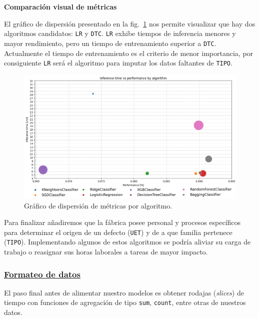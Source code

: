\documentclass[a4paper,12pt]{article}
\begin{document}
		\textbf{Comparación visual de métricas}
				
		El gráfico de dispersión presentado en la fig.~\ref{fig:inference_training_perfo_uet} nos permite visualizar que hay dos algoritmos candidatos: \texttt{LR} y \texttt{DTC}. \texttt{LR} exhibe tiempos de inferencia menores y mayor rendimiento, pero un tiempo de entrenamiento superior a \texttt{DTC}. Actualmente el tiempo de entrenamiento es el criterio de menor importancia, por consiguiente \texttt{LR} será el algoritmo para imputar los datos faltantes de \texttt{TIPO}.
				
		\begin{figure}[H]
			\begin{center}
				\includegraphics[width=1\textwidth]{inference_training_perfo_uet.png}
				\caption{Gráfico de dispersión de métricas por algoritmo.}
				\label{fig:inference_training_perfo_uet}
			\end{center}
		\end{figure}
				
		Para finalizar añadiremos que la fábrica posee personal y procesos específicos para determinar el origen de un defecto (\texttt{UET}) y de a que familia pertenece (\texttt{TIPO}). Implementando algunos de estos algoritmos se podría aliviar su carga de trabajo o  reasignar sus horas laborales a tareas de mayor impacto.
				
		\subsubsection{\href{https://github.com/GeraCollante/tesis-icomp-machinelearning/blob/main/DataFormatting.ipynb}{\color{blue}Formateo de datos}}\label{DataFormatting}
				
		El paso final antes de alimentar nuestro modelos es obtener rodajas (\textit{slices}) de tiempo con funciones de agregación de tipo \texttt{sum}, \texttt{count}, entre otras de nuestros datos. 
				
\end{document}
